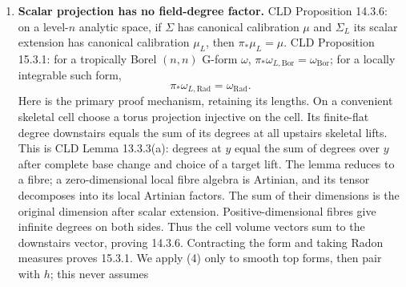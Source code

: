 \documentclass[11pt]{article}
\begin{document}
\begin{enumerate}
  finite on a compact moment domain. Lower-dimensional cells have no top
  measure. Compact moment images are finite polyhedra by Ducros,
  Theorem 3.2(1), the underlying polyhedrality theorem cited in CLD
  12.2.4. Take \(\Gamma=\{1\}\): the compact domains are strict, and
  \(\Gamma\cdot|K^\times|\) is nontrivial because the ground field
  is nontrivially valued. The theorem permits the actual possibly
  singular and nonreduced structure and gives dimension at most the
  source dimension. The dimension bound is
  specifically CLD 12.2.10(1)--(2):
  \(\dim_{\mathrm{trop},x}f\le d_K(x)\le\dim_xX\) and, for compact
  \(X\), \(\dim f_{\mathrm{trop}}(X)=\sup_x\dim_{\mathrm{trop},x}f\).
  Thus compact curve images have dimension at most one. We do not use a
  claim that a moment image always has dimension equal to its source;
  constant moments rule out that reading. CLD 7.3.5 defines integration
  currents for locally integrable multipliers; a continuous finite
  multiplier is locally integrable. Section 8 proves the carrier
  total-variation estimate needed here, before any possibly cancelling
  signed pushforward.
\item
  \textbf{Scalar projection has no field-degree factor.} CLD Proposition
  14.3.6: on a level-\(n\) analytic space, if \(\Sigma\) has canonical
  calibration \(\mu\) and \(\Sigma_L\) its scalar extension has
  canonical calibration \(\mu_L\), then \(\pi_*\mu_L=\mu\). CLD
  Proposition 15.3.1: for a tropically Borel \((n,n)\) G-form
  \(\omega\), \(\pi_*\omega_{L,\mathrm{Bor}}=\omega_{\mathrm{Bor}}\);
  for a locally integrable such form, \[
             \pi_*\omega_{L,\mathrm{Rad}}
                       =\omega_{\mathrm{Rad}}.          \tag{4}
  \] Here is the primary proof mechanism, retaining its lengths. On a
  convenient skeletal cell choose a torus projection injective on the
  cell. Its finite-flat degree downstairs equals the sum of its degrees
  at all upstairs skeletal lifts. This is CLD Lemma 13.3.3(a): degrees
  at \(y\) equal the sum of degrees over \(y\) after complete base
  change and choice of a target lift. The lemma reduces to a fibre; a
  zero-dimensional local fibre algebra is Artinian, and its tensor
  decomposes into its local Artinian factors. The sum of their
  dimensions is the original dimension after scalar extension.
  Positive-dimensional fibres give infinite degrees on both sides. Thus
  the cell volume vectors sum to the downstairs vector, proving 14.3.6.
  Contracting the form and taking Radon measures proves 15.3.1. We apply
  (4) only to smooth top forms, then pair with \(h\); this never assumes

\end{enumerate}
\end{document}
